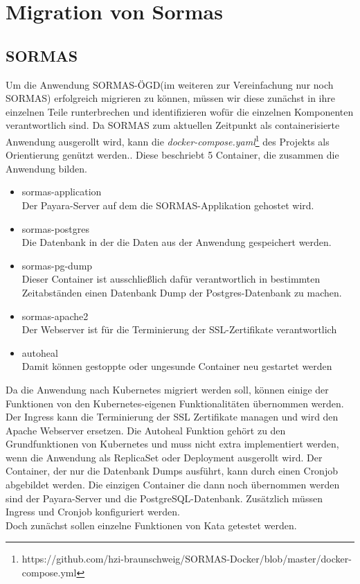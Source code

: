 \chapter{Migration von Sormas}

\section{SORMAS}
\label{ref:sormas_strucure}
Um die Anwendung \ac{SORMAS-ÖGD}(im weiteren zur Vereinfachung nur noch \ac{SORMAS}) erfolgreich migrieren zu können, müssen wir diese zunächst in ihre einzelnen Teile runterbrechen und identifizieren wofür die einzelnen Komponenten verantwortlich sind.
Da \ac{SORMAS} zum aktuellen Zeitpunkt als containerisierte Anwendung ausgerollt wird, kann die \textit{docker-compose.yaml}\footnote{https://github.com/hzi-braunschweig/SORMAS-Docker/blob/master/docker-compose.yml} des Projekts als Orientierung genützt werden..
Diese beschriebt 5 Container, die zusammen die Anwendung bilden.
\begin{itemize}
    \item sormas-application \\ Der Payara-Server auf dem die \ac{SORMAS}-Applikation gehostet wird.
    \item sormas-postgres \\ Die Datenbank in der die Daten aus der Anwendung gespeichert werden.
    \item sormas-pg-dump \\ Dieser Container ist ausschließlich dafür verantwortlich in bestimmten Zeitabständen einen Datenbank Dump der Postgres-Datenbank zu machen.
    \item sormas-apache2 \\ Der Webserver ist für die Terminierung der \ac{SSL}-Zertifikate verantwortlich
    \item autoheal \\ Damit können gestoppte oder ungesunde Container neu gestartet werden
\end{itemize}
Da die Anwendung nach Kubernetes migriert werden soll, können einige der Funktionen von den Kubernetes-eigenen Funktionalitäten übernommen werden. 
Der Ingress kann die Terminierung der \ac{SSL} Zertifikate managen und wird den Apache Webserver ersetzen.
Die Autoheal Funktion gehört zu den Grundfunktionen von Kubernetes und muss nicht extra implementiert werden, wenn die Anwendung als ReplicaSet oder Deployment ausgerollt wird.
Der Container, der nur die Datenbank Dumps ausführt, kann durch einen Cronjob abgebildet werden. 
Die einzigen Container die dann noch übernommen werden sind der Payara-Server und die PostgreSQL-Datenbank.
Zusätzlich müssen Ingress und Cronjob konfiguriert werden. \\
Doch zunächst sollen einzelne Funktionen von Kata getestet werden.



